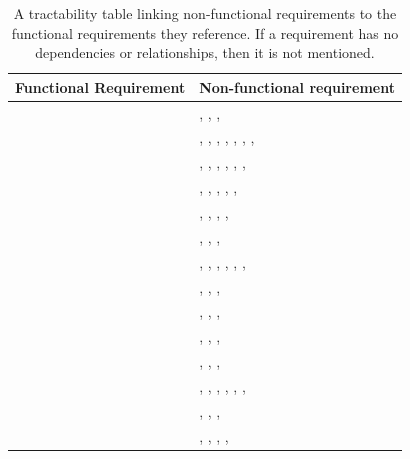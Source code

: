 \documentclass{article}
\begin{document}
\begin{table}[!h]
\begin{center}
\caption {A tractability table linking non-functional requirements to the functional requirements they reference. If a requirement has no dependencies or relationships, then it is not mentioned. }
\label{TRACE_FR_NFR}
\begin{tabular}{ | m{7cm} | m{7cm} | }
\hline
Functional Requirement & Non-functional requirement  \\
\hline
\nameref{STA_000} & \nameref{PERF_007}, \nameref{SAFE_001}, \nameref{SAFE_003}, \nameref{USE_003}  \\
\hline
\nameref{STA_001} & \nameref{PERF_002}, \nameref{PERF_004}, \nameref{PERF_005}, \nameref{PERF_006}, \nameref{PERF_007}, \nameref{SAFE_001}, \nameref{SAFE_003}, \nameref{USE_003}  \\
\hline
\nameref{STA_002} & \nameref{PERF_003}, \nameref{PERF_004}, \nameref{PERF_006}, \nameref{PERF_007}, \nameref{SAFE_001}, \nameref{SAFE_003}, \nameref{USE_003}  \\
\hline
\nameref{STA_003} & \nameref{PERF_001}, \nameref{PERF_004}, \nameref{PERF_007}, \nameref{SAFE_001}, \nameref{SAFE_003}, \nameref{USE_003}  \\
\hline
\nameref{STA_004} & \nameref{PERF_004}, \nameref{PERF_007}, \nameref{SAFE_001}, \nameref{SAFE_003}, \nameref{USE_003}  \\
\hline
\nameref{STA_005} & \nameref{PERF_004}, \nameref{PERF_007}, \nameref{SAFE_001}, \nameref{SAFE_003}  \\
\hline
\nameref{STA_006} & \nameref{PERF_002}, \nameref{PERF_004}, \nameref{PERF_006}, \nameref{PERF_007}, \nameref{SAFE_001}, \nameref{SAFE_003}, \nameref{USE_003}  \\
\hline
\nameref{STA_007} & \nameref{PERF_007}, \nameref{SAFE_001}, \nameref{SAFE_003}, \nameref{USE_003}  \\
\hline
\nameref{STA_008} & \nameref{PERF_007}, \nameref{SAFE_001}, \nameref{SAFE_003}, \nameref{USE_003}  \\
\hline
\nameref{STA_009} & \nameref{PERF_007}, \nameref{SAFE_001}, \nameref{SAFE_003}, \nameref{USE_003}  \\
\hline
\hline
\nameref{STA_010} & \nameref{PERF_007}, \nameref{SAFE_001}, \nameref{SAFE_003}, \nameref{USE_003}  \\
\hline
\nameref{STA_011} & \nameref{PERF_003}, \nameref{PERF_004}, \nameref{PERF_006}, \nameref{PERF_007}, \nameref{SAFE_001}, \nameref{SAFE_003}, \nameref{USE_003}  \\
\hline
\nameref{STA_012} & \nameref{PERF_007}, \nameref{SAFE_001}, \nameref{SAFE_003}, \nameref{USE_003}  \\
\hline
\nameref{STA_013} & \nameref{PERF_002}, \nameref{PERF_007}, \nameref{SAFE_001}, \nameref{SAFE_003}, \nameref{USE_003}  \\
\hline

\end{tabular}
\end{center}
\end{table}
\end{document}
